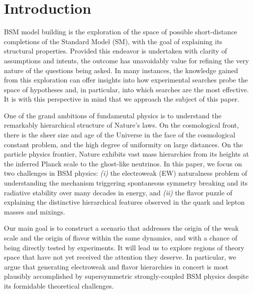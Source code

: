 \documentclass[a4paper,12pt]{article}
\begin{document}
\thispagestyle{empty}
\vfill


\newpage
{\small
\tableofcontents
}
\newpage

\section{Introduction}
\label{sec:intro}

BSM model building is the exploration of the space of possible short-distance completions of the Standard Model (SM), with the goal of explaining its structural properties. Provided this endeavor is undertaken with clarity of assumptions and intents, the outcome has unavoidably value for refining the very nature of the questions being asked. In many instances, the knowledge gained from this exploration can offer insights into how experimental searches probe the space of hypotheses and, in particular, into which searches are the most effective. It is with this perspective in mind that we approach the subject of this paper.

One of the grand ambitions of fundamental physics is to understand the remarkably hierarchical structure of Nature's laws. On the cosmological front, there is the sheer size and age of the Universe in the face of the cosmological constant problem, and the high degree of uniformity on large distances. On the particle physics frontier, Nature exhibits vast mass hierarchies from its heights at the inferred Planck scale to the ghost-like neutrinos. In this paper, we focus on two challenges in BSM physics: {\it (i)} the electroweak (EW) naturalness problem of understanding the mechanism triggering spontaneous symmetry breaking and its radiative stability over many decades in energy, and {\it (ii)} the flavor puzzle of explaining the distinctive hierarchical features observed in the quark and lepton masses and mixings. 

Our main goal is to construct a scenario that addresses the origin of the weak scale and the origin of flavor within the same dynamics, and with a chance of being  directly tested by experiments. It will lead us to explore regions of theory space that have not yet received the attention they deserve. In particular, we argue that generating electroweak and flavor hierarchies in concert is most plausibly 
 accomplished by supersymmetric strongly-coupled BSM physics despite its formidable theoretical challenges. 
\end{document}
